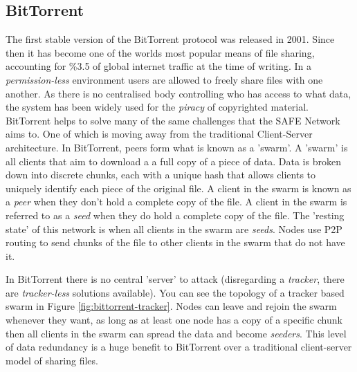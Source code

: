 \subsection{BitTorrent}

The first stable version of the BitTorrent\cite{cohen2008bittorrent} protocol was released in 2001. Since then it has become one of the worlds most popular means of file sharing, accounting for \%3.5 of global internet traffic at the time of writing\cite{bittorrent-usage}. In a \textit{permission-less} environment users are allowed to freely share files with one another. As there is no centralised body controlling who has access to what data, the system has been widely used for the \textit{piracy} of copyrighted material. BitTorrent helps to solve many of the same challenges that the SAFE Network aims to. One of which is moving away from the traditional Client-Server architecture. In BitTorrent, peers form what is known as a 'swarm'. A 'swarm' is all clients that aim to download a a full copy of a piece of data. Data is broken down into discrete chunks, each with a unique hash that allows clients to uniquely identify each piece of the original file. A client in the swarm is known as a \textit{peer} when they don't hold a complete copy of the file. A client in the swarm is referred to as a \textit{seed} when they do hold a complete copy of the file. The 'resting state' of this network is when all clients in the swarm are \textit{seeds}. Nodes use P2P routing to send chunks of the file to other clients in the swarm that do not have it.

In BitTorrent there is no central 'server' to attack (disregarding a \textit{tracker}, there are \textit{tracker-less} solutions available). You can see the topology of a tracker based swarm in Figure \ref{fig:bittorrent-tracker}. Nodes can leave and rejoin the swarm whenever they want, as long as at least one node has a copy of a specific chunk then all clients in the swarm can spread the data and become \textit{seeders}. This level of data redundancy is a huge benefit to BitTorrent over a traditional client-server model of sharing files.

